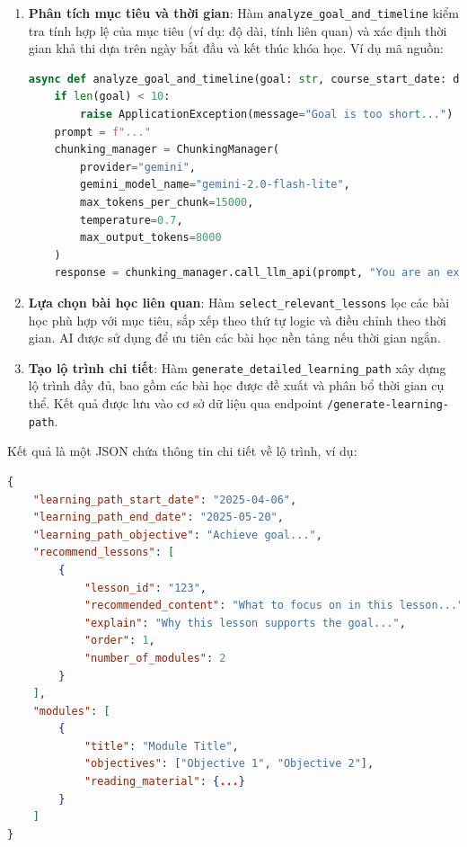 \begin{enumerate}
    \item \textbf{Phân tích mục tiêu và thời gian}: Hàm \texttt{analyze\_goal\_and\_timeline} kiểm tra tính hợp lệ của mục tiêu (ví dụ: độ dài, tính liên quan) và xác định thời gian khả thi dựa trên ngày bắt đầu và kết thúc khóa học. Ví dụ mã nguồn:
    \begin{lstlisting}[language=Python]
async def analyze_goal_and_timeline(goal: str, course_start_date: datetime, ...):
    if len(goal) < 10:
        raise ApplicationException(message="Goal is too short...")
    prompt = f"..."
    chunking_manager = ChunkingManager(
        provider="gemini",
        gemini_model_name="gemini-2.0-flash-lite",
        max_tokens_per_chunk=15000,
        temperature=0.7,
        max_output_tokens=8000
    )
    response = chunking_manager.call_llm_api(prompt, "You are an expert in goal validation and timeline analysis.")
    \end{lstlisting}

    \item \textbf{Lựa chọn bài học liên quan}: Hàm \texttt{select\_relevant\_lessons} lọc các bài học phù hợp với mục tiêu, sắp xếp theo thứ tự logic và điều chỉnh theo thời gian. AI được sử dụng để ưu tiên các bài học nền tảng nếu thời gian ngắn.

    \item \textbf{Tạo lộ trình chi tiết}: Hàm \texttt{generate\_detailed\_learning\_path} xây dựng lộ trình đầy đủ, bao gồm các bài học được đề xuất và phân bổ thời gian cụ thể. Kết quả được lưu vào cơ sở dữ liệu qua endpoint \texttt{/generate-learning-path}.
\end{enumerate}

Kết quả là một JSON chứa thông tin chi tiết về lộ trình, ví dụ:
\begin{lstlisting}[language=JSON]
{
    "learning_path_start_date": "2025-04-06",
    "learning_path_end_date": "2025-05-20",
    "learning_path_objective": "Achieve goal...",
    "recommend_lessons": [
        {
            "lesson_id": "123",
            "recommended_content": "What to focus on in this lesson...",
            "explain": "Why this lesson supports the goal...",
            "order": 1,
            "number_of_modules": 2
        }
    ],
    "modules": [
        {
            "title": "Module Title",
            "objectives": ["Objective 1", "Objective 2"],
            "reading_material": {...}
        }
    ]
}
\end{lstlisting}

